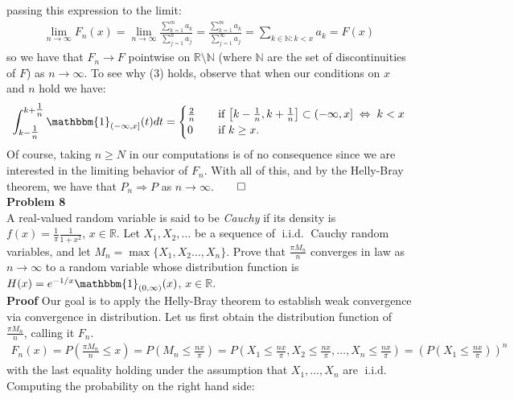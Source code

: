 \documentclass[10pt]{article}
\newcommand{\bp}[1]{\left({#1}\right)}
\newcommand{\mbb}[1]{\mathbb{#1}}
\newcommand{\1}[1]{\mathbbm{1}_{#1}}
\DeclareMathOperator{\iid}{i.i.d.}
\begin{document}
    passing this expression to the limit:
    \begin{align*}
        \lim_{n\rightarrow\infty}F_n(x)=\lim_{n\rightarrow\infty}\frac{\sum_{k=1}^ma_k}{\sum_{j=1}^na_j}=\frac{\sum_{k=1}^ma_k}{\sum_{j=1}^\infty a_j}=\sum_{k\in\mbb{N}:k<x}a_k=F(x)
    \end{align*}
    so we have that $F_n\rightarrow F$ pointwise on $\mbb{R}\setminus\mbb{N}$ (where $\mbb{N}$ are the set of discontinuities of $F$) as $n\rightarrow\infty$. To see why (3) holds, observe that when our conditions on $x$ and $n$ hold we have:
    \begin{align*}
        \int_{k-\tfrac{1}{n}}^{k+\tfrac{1}{n}}\1{(-\infty,x]}(t)dt=\begin{cases}
            \frac{2}{n}\quad&\text{if $\left[k-\tfrac{1}{n},k+\tfrac{1}{n}\right]\subset(-\infty,x]\;\Leftrightarrow\;k<x$}\\
            0\quad&\text{if $k\geq x$.}
        \end{cases}
    \end{align*}
    Of course, taking $n\geq N$ in our computations is of no consequence since we are interested in the limiting behavior of $F_n$. With all of this, and by the Helly-Bray theorem, we have that
    $P_n\Longrightarrow P$ as $n\rightarrow\infty$.\hfill{$\qed$}\\[5pt]
    {\bf Problem 8}\\[5pt]
    A real-valued random variable is said to be {\it Cauchy} if its density is $f(x)=\frac{1}{\pi}\frac{1}{1+x^2}$, $x\in\mbb{R}$. Let $X_1,X_2,\dots$ be a sequence of $\iid$ Cauchy random variables, and
    let $M_n=\max\{X_1,X_2\dots, X_n\}$. Prove that $\frac{\pi M_n}{n}$ converges in law as $n\rightarrow\infty$ to a random variable whose distribution function is $H(x)=e^{-1/x}\1{(0,\infty)}(x)$, $x\in\mbb{R}$.\\[5pt]
    {\bf Proof}\hspace{5pt} Our goal is to apply the Helly-Bray theorem to establish weak convergence via convergence in distribution. Let us first obtain the distribution function of $\frac{\pi M_n}{n}$, calling it $F_n$.
    \begin{align*}
        F_n(x)=P\bp{\frac{\pi M_n}{n}\leq x}=P\bp{M_n\leq \frac{nx}{\pi}}=P\bp{X_1\leq \frac{nx}{\pi},X_2\leq\frac{nx}{\pi},\dots,X_n\leq\frac{nx}{\pi}}=\bp{P\bp{X_1\leq\frac{nx}{\pi}}}^n
    \end{align*}
    with the last equality holding under the assumption that $X_1,\dots,X_n$ are $\iid$ Computing the probability on the right hand side:
\end{document}
